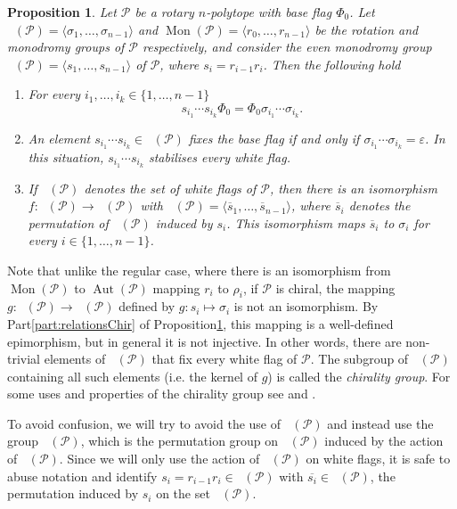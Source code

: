 \documentclass[final]{amsart}
\theoremstyle{plain}
\newtheorem{prop}[thm]{Proposition}
\theoremstyle{definition}
\theoremstyle{remark}
\numberwithin{equation}{section}
\renewcommand{\epsilon}{\varepsilon} \renewcommand{\subset}{\subseteq} \renewcommand{\supset}{\supseteq} \renewcommand{\subsetneq}{\varsubsetneq}
\renewcommand{\{}{\lbrace}
\renewcommand{\}}{\rbrace}
\renewcommand{\bar}{\overline}
\newcommand{\cP}{\mathcal{P}}
\DeclareMathOperator{\aut}{Aut} \DeclareMathOperator{\autp}{\aut^{+}}
\DeclareMathOperator{\Fw}{\mathcal{F}^{w}}
\DeclareMathOperator{\mon}{Mon}
\DeclareMathOperator{\monp}{\mon^{+}}
\DeclareMathOperator{\monw}{\mon^{w}}
\newcommand{\baseFlag}{\Phi_{0}}
\begin{document}
\begin{prop}\label{prop:autpAsMonPChir}
  Let $\cP$ be a rotary $n$-polytope with base flag $\baseFlag$. Let $\autp(\cP)=\langle \sigma_{1}, \dots,  \sigma_{n-1} \rangle$ and $\mon(\cP)=\langle r_{0}, \dots, r_{n-1} \rangle$ be the rotation and monodromy groups of $\cP$ respectively, and consider the even monodromy group $\monp(\cP) = \langle s_{1}, \dots, s_{n-1} \rangle$ of $\cP$, where $s_{i}=r_{i-1}r_{i}$.
  Then the following hold
\begin{enumerate}
  \item\label{part:jumpsChir} For every $i_{1}, \dots,i_{k} \in \{1, \dots, n-1\}$ \[s_{i_{1}}\cdots s_{i_{k}}\baseFlag=\baseFlag\sigma_{i_{1}}\cdots\sigma_{i_{k}}.\]
  \item\label{part:relationsChir} An element $s_{i_{1}}\cdots s_{i_{k}}\in\monp(\cP)$ fixes the base flag if and only if $\sigma_{i_{1}}\cdots \sigma_{i_{k}} = \epsilon$. 
  In this situation, $s_{i_{1}} \cdots s_{i_{k}}$ stabilises every white flag. 
  \item\label{part:isomorphismChir} If $\Fw(\cP)$ denotes the set of white flags of $\cP$, then there is an isomorphism $f: \monw(\cP) \to \autp(\cP)$ with $\monw(\cP)= \langle \bar{s}_{1}, \dots, \bar{s}_{n-1} \rangle$, where $\bar{s}_{i}$ denotes the permutation of $\Fw(\cP)$ induced by $s_{i}$. 
  This isomorphism maps $\bar{s}_{i}$ to $\sigma_{i}$ for every $i \in \{1, \dots, n-1\}$.
\end{enumerate} 
\end{prop}

Note that unlike the regular case, where there is an isomorphism from $\mon(\cP)$ to $\aut(\cP)$ mapping $r_{i}$ to $\rho_{i}$, if $\cP$ is chiral, the mapping $g: \monp(\cP) \to \autp(\cP)$ defined by $ g: s_{i} \mapsto \sigma_{i}$ is not an isomorphism. 
By Part\nobreakspace \ref {part:relationsChir} of Proposition\nobreakspace \ref {prop:autpAsMonPChir}, this mapping is a well-defined epimorphism, but in general it is not injective. 
In other words, there are non-trivial elements of $\monp(\cP)$ that fix every white flag of $\cP$. 
The subgroup of $\monp(\cP)$ containing all such elements (i.e. the kernel of $g$) is called the \emph{chirality group}. 
For some uses and properties of the chirality group see \cite[Section 3]{Cunningham_2012_MixingChiralPolytopes} and \cite[Section 7]{MonsonPellicerWilliams_2014_MixingMonodromyAbstract}.

To avoid confusion, we will try to avoid the use of $\monp(\cP)$ and instead use the group $\monw(\cP)$, which is the permutation group on $\Fw(\cP)$ induced by the action of $\monp(\cP)$.
Since we will only use the action of $\monp(\cP)$ on white flags,  it is safe to abuse notation and identify $s_{i} = r_{i-1} r_{i} \in \monp(\cP)$ with $\bar{s_{i}} \in \monw(\cP)$, the permutation induced by $s_{i}$ on the set $\Fw(\cP)$.
\end{document}

